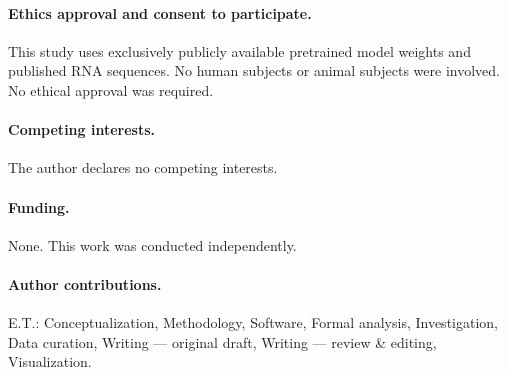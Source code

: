 \documentclass[11pt]{article}
\begin{document}
\paragraph{Ethics approval and consent to participate.}
This study uses exclusively publicly available pretrained model weights
and published RNA sequences. No human subjects or animal subjects were
involved. No ethical approval was required.

\paragraph{Competing interests.} The author declares no competing interests.

\paragraph{Funding.} None. This work was conducted independently.

\paragraph{Author contributions.} E.T.: Conceptualization, Methodology,
Software, Formal analysis, Investigation, Data curation, Writing ---
original draft, Writing --- review \& editing, Visualization.
\end{document}
